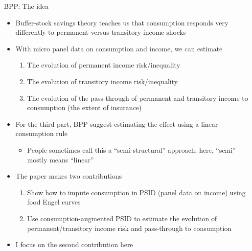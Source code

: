 \documentclass[9pt]{beamer}
\newcommand{\bit}{\begin{itemize}}
\newcommand{\eit}{\end{itemize}}
\newcommand{\ben}{\begin{enumerate}}
\newcommand{\een}{\end{enumerate}}
\begin{document}
\begin{frame}{BPP: The idea}

\bit
\setlength\itemsep{1em}
\item Buffer-stock savings theory teaches us that consumption responds very differently to permanent versus transitory income shocks

\item With micro panel data on consumption and income, we can estimate
\ben
	\item The evolution of permanent income risk/inequality
	\item The evolution of transitory income risk/inequality
	\item The evolution of the pass-through of permanent and transitory income to consumption (the extent of insurance)
\een

\item For the third part, BPP suggest estimating the effect using a linear consumption rule
\bit
\setlength\itemsep{0.5em}
	\item People sometimes call this a ``semi-structural'' approach; here, ``semi'' mostly means ``linear''
\eit

\item The paper makes two contributions
\ben
	\item Show how to impute consumption in PSID (panel data on income) using food Engel curves
	\item Use consumption-augmented PSID to estimate the evolution of permanent/transitory income risk and pass-through to consumption
\een

\item I focus on the second contribution here

\eit

\end{frame}
\end{document}

